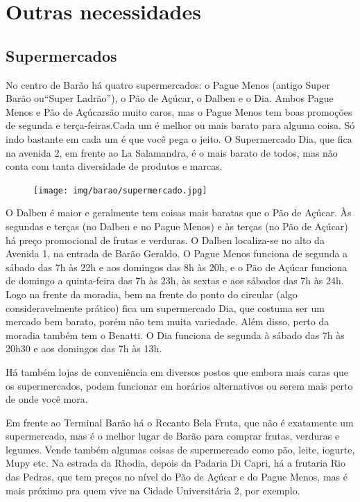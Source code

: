 
\section{Outras necessidades}
\subsection{Supermercados}

No centro de Barão há quatro supermercados: o Pague Menos (antigo Super Barão 
ou``Super Ladrão''), o Pão de Açúcar, o Dalben e o Dia. Ambos Pague Menos e 
Pão de Açúcarsão muito caros, mas o Pague Menos tem boas promoções de 
segunda e terça-feiras.Cada um é melhor ou mais barato para alguma coisa. 
Só indo bastante em cada um é que você pega o jeito. O Supermercado Dia, que
fica na avenida 2, em frente ao La Salamandra, é o mais barato de todos, mas
não conta com tanta diversidade de produtos e marcas.

\begin{figure}[h!]
    \centering
    \texttt{[image: img/barao/supermercado.jpg]}
\end{figure}

O Dalben é maior e geralmente tem coisas mais baratas que o Pão de Açúcar. 
Às segundas e terças (no Dalben e no Pague Menos) e às terças (no Pão de 
Açúcar) há preço promocional de frutas e verduras. O Dalben localiza-se no 
alto da Avenida 1, na entrada de Barão Geraldo. O Pague Menos funciona de 
segunda a sábado das 7h às 22h e aos domingos das 8h às 20h, e o Pão de 
Açúcar funciona de domingo a quinta-feira das 7h às 23h, às sextas e aos 
sábados das 7h às 24h. Logo na frente da moradia, bem na frente do ponto do 
circular (algo consideravelmente prático) fica um supermercado Dia, que costuma 
ser um mercado bem barato, porém não tem muita variedade. Além disso, perto 
da moradia também tem o Benatti. O Dia funciona de segunda à sábado das 7h 
às 20h30 e aos domingos das 7h às 13h.

Há também lojas de conveniência em diversos postos que embora mais caras que os
supermercados, podem funcionar em horários alternativos ou serem mais perto de
onde você mora.

Em frente ao Terminal Barão há o Recanto Bela Fruta, que não é exatamente um
supermercado, mas é o melhor lugar de Barão para comprar frutas, verduras e
legumes. Vende também algumas coisas de supermercado como pão, leite, iogurte,
Mupy etc. Na estrada da Rhodia, depois da Padaria Di Capri, há a frutaria Rio
das Pedras, que tem preços no nível do Pão de Açúcar e do Pague Menos, mas é
mais próximo pra quem vive na Cidade Universitária 2, por exemplo.

